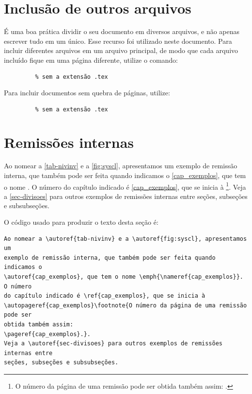 \section{Inclusão de outros arquivos}\label{sec-include}

É uma boa prática dividir o seu documento em diversos arquivos, e não apenas escrever tudo em um único. Esse recurso foi utilizado neste documento. Para incluir diferentes arquivos em um arquivo principal, de modo que cada arquivo incluído fique em uma página diferente, utilize o comando:

\begin{verbatim}
         % sem a extensão .tex
\end{verbatim}

Para incluir documentos sem quebra de páginas, utilize:

\begin{verbatim}
         % sem a extensão .tex
\end{verbatim}

\section{Remissões internas}

Ao nomear a \autoref{tab-nivinv} e a \autoref{fig:syscl}, apresentamos um exemplo de remissão interna, que também pode ser feita quando indicamos o \autoref{cap_exemplos}, que tem o nome \emph{}. O número do capítulo indicado é \ref{cap_exemplos}, que se inicia à \footnote{O número da página de uma remissão pode ser obtida também assim:
\pageref{cap_exemplos}.}. Veja a \autoref{sec-divisoes} para outros exemplos de remissões internas entre seções, subseções e subsubseções.

O código usado para produzir o texto desta seção é:

\begin{verbatim}
Ao nomear a \autoref{tab-nivinv} e a \autoref{fig:syscl}, apresentamos um
exemplo de remissão interna, que também pode ser feita quando indicamos o
\autoref{cap_exemplos}, que tem o nome \emph{\nameref{cap_exemplos}}. O número
do capítulo indicado é \ref{cap_exemplos}, que se inicia à
\autopageref{cap_exemplos}\footnote{O número da página de uma remissão pode ser
obtida também assim:
\pageref{cap_exemplos}.}.
Veja a \autoref{sec-divisoes} para outros exemplos de remissões internas entre
seções, subseções e subsubseções.
\end{verbatim}

